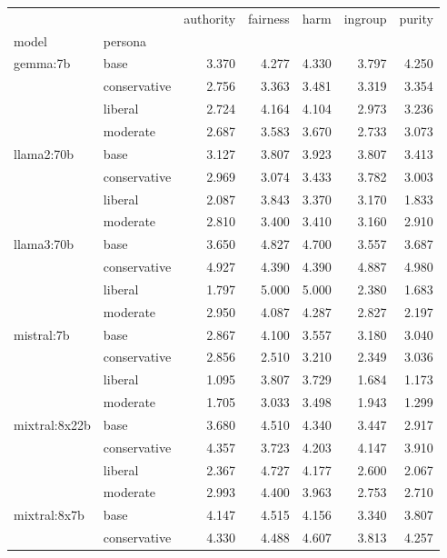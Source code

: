 \begin{table}
\label{tab:questionnaire:moral-foundations:evaluation}
\begin{tabular}{llrrrrr}
\toprule
 &  & authority & fairness & harm & ingroup & purity \\
model & persona &  &  &  &  &  \\
\midrule
\multirow[t]{4}{*}{gemma:7b} & base & 3.370 & 4.277 & 4.330 & 3.797 & 4.250 \\
 & conservative & 2.756 & 3.363 & 3.481 & 3.319 & 3.354 \\
 & liberal & 2.724 & 4.164 & 4.104 & 2.973 & 3.236 \\
 & moderate & 2.687 & 3.583 & 3.670 & 2.733 & 3.073 \\
\cline{1-7}
\multirow[t]{4}{*}{llama2:70b} & base & 3.127 & 3.807 & 3.923 & 3.807 & 3.413 \\
 & conservative & 2.969 & 3.074 & 3.433 & 3.782 & 3.003 \\
 & liberal & 2.087 & 3.843 & 3.370 & 3.170 & 1.833 \\
 & moderate & 2.810 & 3.400 & 3.410 & 3.160 & 2.910 \\
\cline{1-7}
\multirow[t]{4}{*}{llama3:70b} & base & 3.650 & 4.827 & 4.700 & 3.557 & 3.687 \\
 & conservative & 4.927 & 4.390 & 4.390 & 4.887 & 4.980 \\
 & liberal & 1.797 & 5.000 & 5.000 & 2.380 & 1.683 \\
 & moderate & 2.950 & 4.087 & 4.287 & 2.827 & 2.197 \\
\cline{1-7}
\multirow[t]{4}{*}{mistral:7b} & base & 2.867 & 4.100 & 3.557 & 3.180 & 3.040 \\
 & conservative & 2.856 & 2.510 & 3.210 & 2.349 & 3.036 \\
 & liberal & 1.095 & 3.807 & 3.729 & 1.684 & 1.173 \\
 & moderate & 1.705 & 3.033 & 3.498 & 1.943 & 1.299 \\
\cline{1-7}
\multirow[t]{4}{*}{mixtral:8x22b} & base & 3.680 & 4.510 & 4.340 & 3.447 & 2.917 \\
 & conservative & 4.357 & 3.723 & 4.203 & 4.147 & 3.910 \\
 & liberal & 2.367 & 4.727 & 4.177 & 2.600 & 2.067 \\
 & moderate & 2.993 & 4.400 & 3.963 & 2.753 & 2.710 \\
\cline{1-7}
\multirow[t]{4}{*}{mixtral:8x7b} & base & 4.147 & 4.515 & 4.156 & 3.340 & 3.807 \\
 & conservative & 4.330 & 4.488 & 4.607 & 3.813 & 4.257 \\

\end{tabular}
\end{table}

